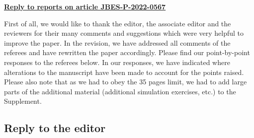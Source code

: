 \documentclass[a4paper,12pt]{article}
\begin{document}
\begin{center}
\underline{\Large\textbf{{Reply to reports on article JBES-P-2022-0567}}}\end{center}
\vspace{10pt}


First of all, we would like to thank the editor, the associate editor and the reviewers for their many comments and suggestions which were very helpful to improve the paper. In the revision, we have addressed all comments of the referees and have rewritten the paper accordingly.
Please find our point-by-point responses to the referees below. In our responses, we have indicated where alterations to the manuscript have been made to account for the points raised. Please also note that as we had to obey the 35 pages limit, we had to add large parts of the additional material (additional simulation exercises, etc.) to the Supplement. 



\subsection*{Reply to the editor}
\end{document}
